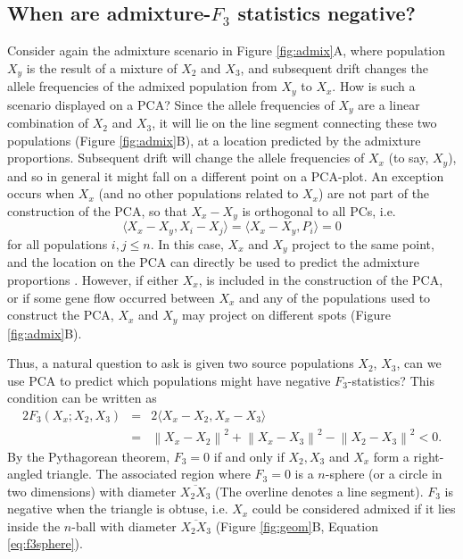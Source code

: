 \documentclass[12pt,fullpage, a4paper]{article}
\newcommand{\normsq}[1]{\left\lVert#1\right\rVert^2}
\begin{document}
\subsection{When are admixture-$F_3$ statistics negative?}
Consider again the admixture scenario in Figure \ref{fig:admix}A, where population $X_y$ is the result of a mixture of $X_2$ and $X_3$, and subsequent drift changes the allele frequencies of the admixed population from $X_y$ to $X_x$. How is such a scenario displayed on a PCA?  Since the allele frequencies of $X_y$ are a linear combination of $X_2$ and $X_3$, it will lie on the line segment connecting these two populations (Figure \ref{fig:admix}B), at a location predicted by the admixture proportions. Subsequent drift will change the allele frequencies of $X_x$ (to say, $X_y$), and so in general it might fall on a different point on a PCA-plot. An exception occurs when $X_x$ (and no other populations related to $X_x$) are not part of the construction of the PCA, so that $X_x - X_y$ is orthogonal to all PCs, i.e. $$\langle X_x - X_y, X_i - X_j \rangle = \langle X_x - X_y, P_i \rangle = 0$$ for all populations $i,j \leq n$. In this case, $X_x$ and $X_y$ project to the same point, and the location on the PCA  can directly be used to predict the admixture proportions \citep{mcvean2009, brisbin2012, oteo-garcia2021}. However, if either $X_x$, is included in the construction of the PCA, or if some gene flow occurred between $X_x$ and any of the populations used to construct the PCA, $X_x$ and $X_y$ may project on different spots (Figure \ref{fig:admix}B). 

Thus, a natural question to ask is given two source populations $X_2$, $X_3$, can we use PCA to predict which populations might have negative $F_3$-statistics? This condition can be written as  
\begin{eqnarray}
2 F_3(X_x; X_2, X_3) &=& 2\langle  X_x - X_2, X_x - X_3 \rangle \nonumber\\
      &=& \normsq{X_x - X_2} + \normsq{X_x - X_3}  - \normsq{X_2 - X_3} < 0 \label{eq:f3neg}\text{.}
\end{eqnarray}
By the Pythagorean theorem, $F_3 = 0 $ if and only if $X_2, X_3$ and $X_x$ form a right-angled triangle. The associated region where $F_3=0$ is a $n$-sphere (or a circle in two dimensions) with diameter $\overline{X_2X_3}$ (The overline denotes a line segment). $F_3$ is negative when the triangle is obtuse, i.e. $X_x$ could be considered admixed if it lies inside the $n$-ball with diameter $\overline{X_2X_3}$ (Figure \ref{fig:geom}B, Equation \ref{eq:f3sphere}). 
\end{document}
